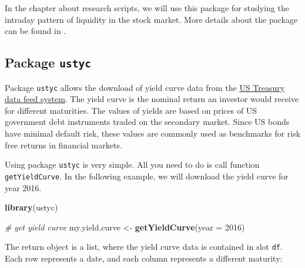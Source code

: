 \documentclass[11pt,]{book}
\newenvironment{Shaded}{\begin{snugshade}}{\end{snugshade}}
\newcommand{\KeywordTok}[1]{\textcolor[rgb]{0.27,0.27,0.27}{\textbf{#1}}}
\newcommand{\DataTypeTok}[1]{\textcolor[rgb]{0.27,0.27,0.27}{#1}}
\newcommand{\DecValTok}[1]{\textcolor[rgb]{0.06,0.06,0.06}{#1}}
\newcommand{\StringTok}[1]{\textcolor[rgb]{0.5,0.5,0.5}{#1}}
\newcommand{\CommentTok}[1]{\textcolor[rgb]{0.56,0.35,0.01}{\textit{#1}}}
\newcommand{\OperatorTok}[1]{\textcolor[rgb]{0.81,0.36,0.00}{\textbf{#1}}}
\newcommand{\NormalTok}[1]{#1}
\begin{document}
In the chapter about research scripts, we will use this package for
studying the intraday pattern of liquidity in the stock market. More
details about the package can be found in \citet{gethfdata}.

\subsection{\texorpdfstring{Package
\texttt{ustyc}}{Package ustyc}}\label{package-ustyc}

Package \texttt{ustyc} allows the download of yield curve data from the
\href{https://www.treasury.gov/Pages/default.aspx}{US Treasury data feed
system}. The yield curve is the nominal return an investor would receive
for different maturities. The values of yields are based on prices of US
government debt instruments traded on the secondary market. Since US
bonds have minimal default risk, these values are commonly used as
benchmarks for risk free returns in financial markets. 

Using package \texttt{ustyc} is very simple. All you need to do is call
function \texttt{getYieldCurve}. In the following example, we will
download the yield curve for year 2016. 

\begin{Shaded}
\begin{Highlighting}[]
\KeywordTok{library}\NormalTok{(ustyc)}

\CommentTok{# get yield curve}
\NormalTok{my.yield.curve <-}\StringTok{ }\KeywordTok{getYieldCurve}\NormalTok{(}\DataTypeTok{year =} \DecValTok{2016}\NormalTok{)}
\end{Highlighting}
\end{Shaded}

The return object is a list, where the yield curve data is contained in
slot \texttt{df}. Each row represents a date, and each column represents
a different maturity:

\begin{Shaded}
\end{Shaded}
\end{document}
